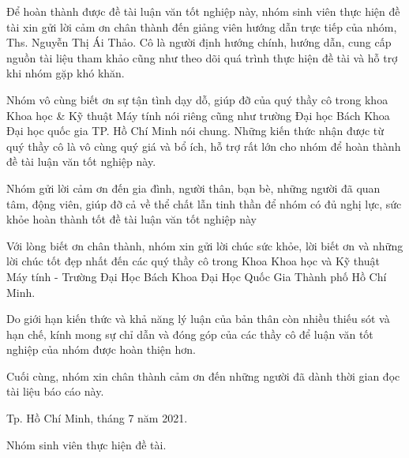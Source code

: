 Để hoàn thành được đề tài luận văn tốt nghiệp này, nhóm sinh viên thực hiện đề tài xin gửi lời cảm ơn chân thành đến giảng viên hướng dẫn trực tiếp của nhóm, Ths. Nguyễn Thị Ái Thảo. Cô là người định hướng chính, hướng dẫn, cung cấp nguồn tài liệu tham khảo cũng như theo dõi quá trình thực hiện đề tài và hỗ trợ khi nhóm gặp khó khăn.\par

Nhóm vô cùng biết ơn sự tận tình dạy dỗ, giúp đỡ của quý thầy cô trong khoa Khoa học \& Kỹ thuật Máy tính nói riêng cũng như trường Đại học Bách Khoa  Đại học quốc gia TP. Hồ Chí Minh nói chung. Những kiến thức nhận được từ quý thầy cô là vô cùng quý giá và bổ ích, hỗ trợ rất lớn cho nhóm để hoàn thành đề tài luận văn tốt nghiệp này.\par

Nhóm gửi lời cảm ơn đến gia đình, người thân, bạn bè, những người đã quan tâm, động viên, giúp đỡ cả về thể chất lẫn tinh thần để nhóm có đủ nghị lực, sức khỏe hoàn thành tốt đề tài luận văn tốt nghiệp này\par

Với lòng biết ơn chân thành, nhóm xin gửi lời chúc sức khỏe, lời biết ơn
và những lời chúc tốt đẹp nhất đến các quý thầy cô trong Khoa Khoa học và Kỹ thuật Máy tính - Trường Đại Học Bách Khoa Đại Học Quốc Gia Thành phố Hồ Chí Minh.\par

Do giới hạn kiến thức và khả năng lý luận của bản thân còn nhiều thiếu sót và hạn chế, kính mong sự chỉ dẫn và đóng góp của các thầy cô để luận văn tốt nghiệp của nhóm được hoàn thiện hơn.\par

Cuối cùng, nhóm xin chân thành cảm ơn đến những người đã dành thời gian đọc tài liệu báo cáo này.

\begin{flushright}
Tp. Hồ Chí Minh, tháng 7 năm 2021.\par

Nhóm sinh viên thực hiện đề tài.
\end{flushright}